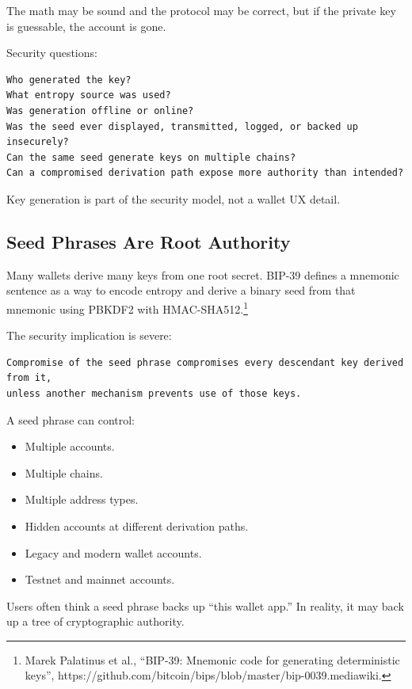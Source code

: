 The math may be sound and the protocol may be correct, but if the
private key is guessable, the account is gone.

Security questions:

\begin{lstlisting}
Who generated the key?
What entropy source was used?
Was generation offline or online?
Was the seed ever displayed, transmitted, logged, or backed up insecurely?
Can the same seed generate keys on multiple chains?
Can a compromised derivation path expose more authority than intended?
\end{lstlisting}

Key generation is part of the security model, not a wallet UX detail.

\subsection{Seed Phrases Are Root Authority}

Many wallets derive many keys from one root secret. BIP-39 defines a
mnemonic sentence as a way to encode entropy and derive a binary seed
from that mnemonic using PBKDF2 with HMAC-SHA512.\footnote{Marek
  Palatinus et al., ``BIP-39: Mnemonic code for generating deterministic
  keys'',
  https://github.com/bitcoin/bips/blob/master/bip-0039.mediawiki.}

The security implication is severe:

\begin{lstlisting}
Compromise of the seed phrase compromises every descendant key derived from it,
unless another mechanism prevents use of those keys.
\end{lstlisting}

A seed phrase can control:

\begin{itemize}
\tightlist
\item
  Multiple accounts.
\item
  Multiple chains.
\item
  Multiple address types.
\item
  Hidden accounts at different derivation paths.
\item
  Legacy and modern wallet accounts.
\item
  Testnet and mainnet accounts.
\end{itemize}

Users often think a seed phrase backs up ``this wallet app.'' In
reality, it may back up a tree of cryptographic authority.

